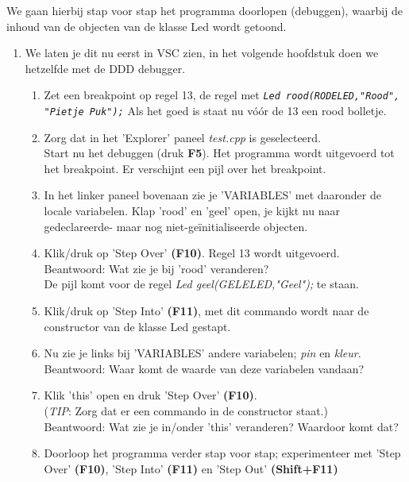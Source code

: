 We gaan hierbij stap voor stap het programma doorlopen (debuggen), waarbij de inhoud van de objecten van de klasse Led wordt getoond.

\begin{enumerate} [label=\alph*]
	\item We laten je dit nu eerst in VSC zien, in het volgende hoofdstuk doen we hetzelfde met de DDD debugger.
	\begin{enumerate} [label=\roman*]
		
		\item Zet een breakpoint op regel 13, de regel met \texttt{\textit{Led rood(RODELED,"Rood", "Pietje Puk");}} Als het goed is staat nu vóór de 13 een rood bolletje.
		
		\item Zorg dat in het 'Explorer' paneel \textit{test.cpp} is geselecteerd. \\Start nu het debuggen (druk \textbf{F5}). Het programma wordt uitgevoerd tot het breakpoint.  Er verschijnt een pijl over het breakpoint. 
		\item In het linker paneel bovenaan zie je 'VARIABLES' met daaronder de locale variabelen. Klap 'rood' en 'geel' open, je kijkt nu naar gedeclareerde- maar nog niet-geïnitialiseerde objecten.
		\item Klik/druk op 'Step Over' \textbf{(F10)}. Regel 13 wordt uitgevoerd. 
		\\ Beantwoord: Wat zie je bij 'rood' veranderen? \\
		De pijl komt voor de regel \textit{Led geel(GELELED,"Geel");} te staan.
		\item Klik/druk op 'Step Into' \textbf{(F11)}, met dit commando wordt naar de constructor van de klasse Led gestapt. 
		\item Nu zie je links bij 'VARIABLES' andere variabelen; \textit{pin} en \textit{kleur}. \\Beantwoord: Waar komt de waarde van deze variabelen vandaan?
		\item Klik 'this' open en druk 'Step Over' \textbf{(F10)}.  \\(\textit{TIP}: Zorg dat er een commando in de constructor staat.) 
		\\Beantwoord: Wat zie je in/onder 'this' veranderen? Waardoor komt dat?
		\item Doorloop het programma verder stap voor stap; experimenteer met 'Step Over' \textbf{(F10)}, 'Step Into' \textbf{(F11)} en 'Step Out' \textbf{(Shift+F11)}
    \end{enumerate}
\end{enumerate}


